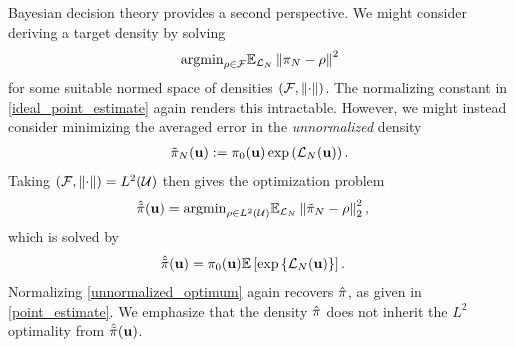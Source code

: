 \documentclass[12pt]{article}
\begin{document}
Bayesian decision theory provides a second perspective. We might consider deriving a target density by solving 
\begin{align}
\text{argmin}_{\rho \in \mathcal{F}} \mathbb{E}_{\mathcal{L}_{N}} \left\lVert\pi_{N} - \rho\right\rVert^2
\end{align}  
for some suitable normed space of densities $(\mathcal{F}, \left\lVert\cdot\right\rVert)$. The normalizing constant in \ref{ideal_point_estimate} again renders 
this intractable. However, we might instead consider minimizing the averaged error in the \textit{unnormalized} density 
\begin{align}
\tilde{\pi}_{N}(\mathbf{u}) := \pi_0(\mathbf{u}) \exp\left(\mathcal{L}_{N}(\mathbf{u})\right). 
\end{align}
Taking $(\mathcal{F}, \left\lVert\cdot\right\rVert) = L^2(\mathcal{U})$ then gives the optimization problem 
\begin{align}
\hat{\tilde{\pi}}(\mathbf{u}) &= \text{argmin}_{\rho \in L^2(\mathcal{U})} \mathbb{E}_{\mathcal{L}_{N}} \left\lVert\tilde{\pi}_{N} - \rho\right\rVert_2^2,
\end{align} 
which is solved by 
\begin{align}
\hat{\tilde{\pi}}(\mathbf{u}) &= \pi_0(\mathbf{u}) \mathbb{E}\left[\exp\left\{\mathcal{L}_{N}(\mathbf{u})\right\} \right]. \label{unnormalized_optimum}
\end{align}
Normalizing \ref{unnormalized_optimum} again recovers $\hat{\pi}$, as given in \ref{point_estimate}. We emphasize that the density 
$\hat{\pi}$ does not inherit the $L^2$ optimality from $\hat{\tilde{\pi}}(\mathbf{u})$. 


\end{document}
